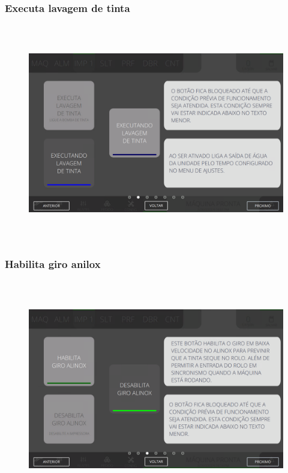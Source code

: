 \newpage
\thispagestyle{fancy}
\vspace*{40 pt}
\subsubsection{\small{Executa lavagem de tinta}}\label{miniTelaComandoImpressoraExecutaLavagemDeTinta}
\vspace*{\fill}
\begin{figure}[h]
  \centering
  \includegraphics[width=576px,height=360px]{src/imagesMiniline/04-Printer/commands/e2.png}
\end{figure}
\vspace*{\fill}

\newpage
\thispagestyle{fancy}
\vspace*{40 pt}
\subsubsection{\small{Habilita giro anilox}}\label{miniTelaComandoImpressoraHabilitaGiroAnilox}
\vspace*{\fill}
\begin{figure}[h]
  \centering
  \includegraphics[width=576px,height=360px]{src/imagesMiniline/04-Printer/commands/e3.png}
\end{figure}
\vspace*{\fill}

